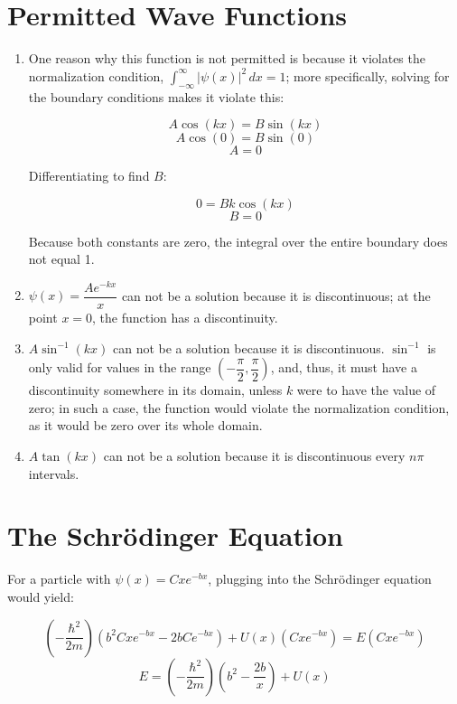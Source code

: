 \begin{enumerate}

    \section*{Permitted Wave Functions}

    \begin{enumerate}

      \item One reason why this function is not permitted is because it violates the normalization condition, $\displaystyle \int_{-\infty}^{\infty}|\psi(x)|^2\,dx=1$; more specifically, solving for the boundary conditions makes it violate this:

        $$A\cos(kx)=B\sin(kx)$$
        $$A\cos(0)=B\sin(0)$$
        $$A=0$$

        Differentiating to find $B$:

        $$0=Bk\cos(kx)$$
        $$B=0$$

        Because both constants are zero, the integral over the entire boundary does not equal 1.

      \item $\psi(x)=\dfrac{Ae^{-kx}}{x}$ can not be a solution because it is discontinuous; at the point $x=0$, the function has a discontinuity.

      \item $A\sin^{-1}(kx)$ can not be a solution because it is discontinuous. $\sin^{-1}$ is only valid for values in the range $\left(-\dfrac{\pi}{2}, \dfrac{\pi}{2}\right)$, and, thus, it must have a discontinuity somewhere in its domain, unless $k$ were to have the value of zero; in such a case, the function would violate the normalization condition, as it would be zero over its whole domain.

      \item $A\tan(kx)$ can not be a solution because it is discontinuous every $n\pi$ intervals.

    \end{enumerate}

    \section*{The Schr\"odinger Equation}

    For a particle with $\psi(x)=Cxe^{-bx}$, plugging into the Schr\"odinger equation would yield:

    $$\left( -\dfrac{\hbar^2}{2m} \right)(b^2Cxe^{-bx}-2bCe^{-bx})+U(x)(Cxe^{-bx})=E(Cxe^{-bx})$$
    $$E=\left( -\dfrac{\hbar^2}{2m} \right)\left(b^2-\frac{2b}{x}\right)+U(x)$$


\end{enumerate}
